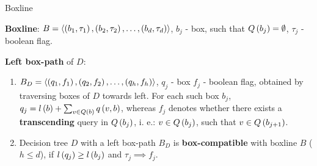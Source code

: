 \begin{frame}
    
\end{frame}
\begin{frame}{Boxline}
    \begin{definition}
        \textbf{Boxline}: $B=\langle \left( b_1, \tau_1 \right),\left( b_2, \tau_2 \right),\dots, \left( b_d, \tau_d \right) \rangle$, $b_j$ - box, such that $Q\left( b_j \right)=\emptyset$, $\tau_j$ - boolean flag. 
    \end{definition}
    \pause
    \begin{definition}
    \textbf{Left box-path} of $D$: 
    \begin{enumerate}
        \item $B_D=\langle \left( q_1, f_1 \right),\left( q_2, f_2 \right),\dots, \left( q_h, f_h \right) \rangle$, $q_j$ - box $f_j$ - boolean flag, obtained by traversing boxes of $D$ towards left. For each such box $b_j$, $q_j=l\left( b \right)+\sum_{v\in Q\left( b \right)}q\left( v, b \right)$, whereas $f_j$ denotes whether there exists a \textbf{transcending} query in $Q\left( b_j \right)$, i. e.: $v\in Q\left( b_j \right)$, such that $v\in Q\left( b_{j+1} \right)$.
        \item Decision tree $D$ with a left box-path $B_D$ is \textbf{box-compatible} with boxline $B$ ($h\leq d$), if $l\left( q_j \right)\geq l\left( b_j \right)$ and $\tau_j\implies f_j$.
    \end{enumerate}  
    \end{definition}
\end{frame}
